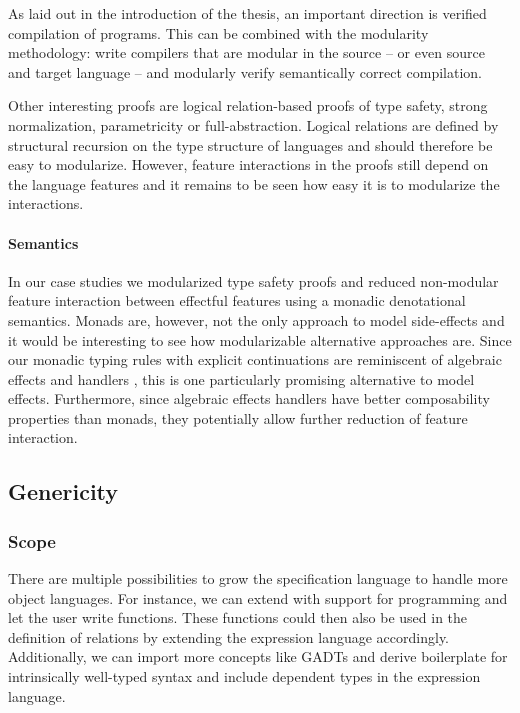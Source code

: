 As laid out in the introduction of the thesis, an important direction is
verified compilation of programs. This can be combined with the modularity
methodology: write compilers that are modular in the source -- or even source
and target language -- and modularly verify semantically correct compilation.

Other interesting proofs are logical relation-based proofs of type safety,
strong normalization, parametricity or full-abstraction. Logical relations are
defined by structural recursion on the type structure of languages and should
therefore be easy to modularize. However, feature interactions in the proofs
still depend on the language features and it remains to be seen how easy it is
to modularize the interactions.

\paragraph{Semantics}
In our case studies we modularized type safety proofs and reduced non-modular
feature interaction between effectful features using a monadic denotational
semantics. Monads are, however, not the only approach to model side-effects and
it would be interesting to see how modularizable alternative approaches are.
Since our monadic typing rules with explicit continuations are reminiscent of
algebraic effects and handlers \cite{eff,handlers,hia}, this is one particularly
promising alternative to model effects. Furthermore, since algebraic effects
handlers have better composability properties than monads, they potentially
allow further reduction of feature interaction.


\subsection{Genericity}


\subsubsection{Scope}
There are multiple possibilities to grow the \Knot specification language to
handle more object languages. For instance, we can extend \Knot with support for
programming and let the user write functions. These functions could then also be
used in the definition of relations by extending the expression language
accordingly. Additionally, we can import more concepts like GADTs and derive
boilerplate for intrinsically well-typed syntax and include dependent types in
the expression language.

